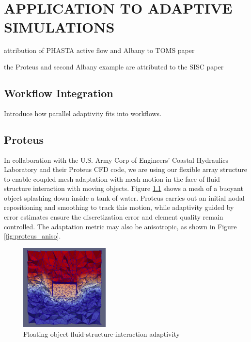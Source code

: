 
\chapter{APPLICATION TO ADAPTIVE SIMULATIONS}
\label{chap:apps}

{\color{red} attribution of PHASTA active flow and Albany to TOMS paper}

{\color{red} the Proteus and second Albany example are attributed to the SISC paper}

\section{Workflow Integration}

Introduce how parallel adaptivity fits into workflows.

\section{Proteus}

In collaboration with the U.S. Army Corp of Engineers'
Coastal Hydraulics Laboratory and their Proteus CFD code,
we are using our flexible array structure to enable
coupled mesh adaptation with mesh motion in the face
of fluid-structure interaction with moving objects.
Figure \ref{fig:proteus} shows a mesh of a buoyant object
splashing down inside a tank of water.
Proteus carries out an initial nodal repositioning and
smoothing to track this motion, while adaptivity
guided by error estimates ensure the discretization
error and element quality remain controlled.
The adaptation metric may also be anisotropic, as shown
in Figure \ref{fig:proteus_aniso}.

\begin{figure}
\begin{center}
\includegraphics[width=0.4\textwidth]{proteus.png}
\caption{Floating object fluid-structure-interaction adaptivity}
\label{fig:proteus}
\end{center}
\end{figure}

